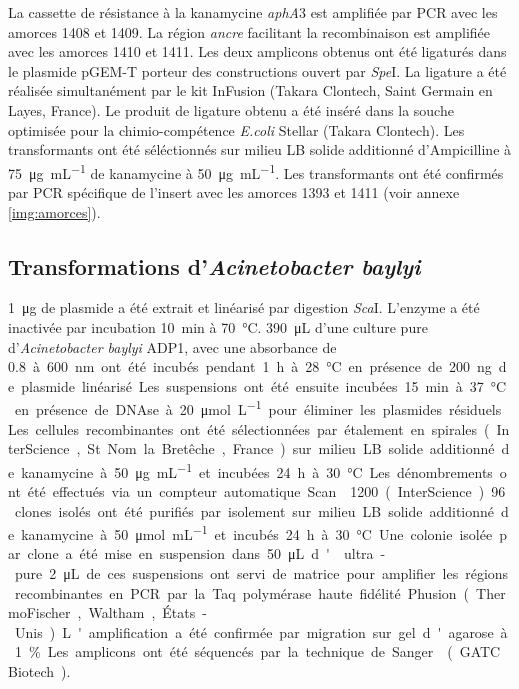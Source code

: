 La cassette de résistance à la kanamycine \emph{aphA}3 est amplifiée par PCR
avec les amorces 1408 et 1409. La région \emph{ancre} facilitant la
recombinaison est amplifiée avec les amorces 1410 et 1411. Les deux
amplicons obtenus ont été ligaturés dans le plasmide pGEM-T porteur des
constructions ouvert par \emph{Spe}I. La ligature a été réalisée simultanément
par le kit InFusion (Takara Clontech, Saint Germain en Layes, France). Le
produit de ligature obtenu a été inséré dans la souche optimisée pour la
chimio-compétence \emph{E.coli} Stellar (Takara Clontech). Les transformants ont
été séléctionnés sur milieu LB solide additionné d'Ampicilline à
\SI{75}{\ug\per\mL} de kanamycine à \SI{50}{\ug\per\mL}. Les transformants ont
été confirmés par PCR spécifique de l'insert avec les amorces 1393 et 1411
(voir annexe \ref{img:amorces}).

\subsection{Transformations d'\emph{Acinetobacter baylyi}}
\label{subsec:transfo}


\SI{1}{\ug} de plasmide a été extrait et linéarisé par digestion \emph{Sca}I.
L'enzyme a été inactivée par incubation \SI{10}{\minute} à \SI{70}{\celsius}.
\SI{390}{\uL} d'une culture pure d'\emph{Acinetobacter baylyi} ADP1, avec une
absorbance de \SI{0,8} à \SI{600}{\nm} ont été incubés pendant \SI{1}{\hour} à
\SI{28}{\celsius} en présence de \SI{200}{\ng} de plasmide linéarisé. Les
suspensions ont été ensuite incubées \SI{15}{\minute} à \SI{37}{\celsius} en
présence de DNAse à \SI{20}{\umol\per\L} pour éliminer les plasmides résiduels.
Les cellules recombinantes ont été sélectionnées par étalement en spirales
(InterScience, St Nom la Bretêche, France) sur milieu LB solide additionné de
kanamycine à \SI{50}{\ug\per\mL} et incubées \SI{24}{\hour} à \SI{30}{\celsius}.
Les dénombrements ont été effectués via un compteur automatique
Scan\textsuperscript{\textregistered}1200 (InterScience).

96 clones isolés ont été purifiés par isolement sur milieu LB solide additionné
de kanamycine à \SI{50}{\umol\per\mL} et incubés \SI{24}{\hour} à
\SI{30}{\celsius}. Une colonie isolée par clone a été mise en suspension dans
\SI{50}{\uL} d' ultra-pure. \SI{2}{\uL} de ces suspensions ont servi de
matrice pour amplifier les régions recombinantes en PCR par la Taq polymérase
haute fidélité Phusion (ThermoFischer, Waltham, États-Unis). L'amplification a
été confirmée par migration sur gel d'agarose à 1\%. Les amplicons ont été
séquencés par la technique de Sanger\cite{sanger_dna_1977} (GATC Biotech).

